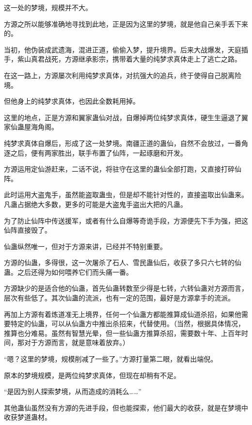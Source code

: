 
\begin{this_body}



这一处的梦境，规模并不大。

方源之所以能够准确地寻找到此地，正是因为这里的梦境，就是他自己亲手丢下来的。

当初，他伪装成武遗海，混进正道，偷偷入梦，提升境界。后来大战爆发，天庭插手，紫山真君战死，方源继承影宗，携带着大量的纯梦求真体走上了逃亡之路。

在这一路上，方源屡次利用纯梦求真体，对抗强大的追兵，终于使得自己脱离险境。

但他身上的纯梦求真体，也因此全数耗用掉。

这里的地点，正是方源和翼家蛊仙对战，自爆掉两位纯梦求真体，硬生生逼退了翼家仙蛊屋海角阁。

纯梦求真体自爆后，形成了这一处梦境。南疆正道的蛊仙，自然不会放过，一番角逐之后，便有两家胜出，联手布置了仙阵，一起琢磨和开发。

方源运用定仙游赶来，二话不说，将驻守在这里的蛊仙全部打跑，又直接打碎仙阵。

此时运用大盗鬼手，虽然能盗取蛊虫，但是却不能针对性的，直接盗取出仙蛊来。凡蛊占据绝大多数，更多的可能是大盗鬼手盗出大把的凡蛊。

为了防止仙阵中传送援军，或者有什么自爆等奇诡手段，方源便先下手为强，把这仙阵直接毁了。

仙蛊纵然唯一，但对于方源来讲，已经并不特别重要。

方源的仙蛊，多得很，这一次屠杀了石人、雪民蛊仙后，收获了多只六七转的仙蛊。之后还得为如何喂养它们而头痛一番。

方源缺少的是适合他的仙蛊，首先仙蛊转数至少得是七转，六转仙蛊对方源而言，层次有些低了。其次仙蛊的流派，也有一定的范围，最好是方源拿手的流派。

再加上方源有着炼道准无上境界，任何一个仙蛊方都能推算成仙道杀招，如果他需要特定的仙蛊，可以从仙蛊方中推出杀招来，代替使用。（当然，根据具体情况，推算也分难易。虽然有智慧光晕，但一些仙蛊方推算杀招，需要数十年、上百年时间，那对于方源而言，就是意味着放弃。）

“嗯？这里的梦境，规模削减了一些了。”方源打量第二眼，就看出端倪。

原本的梦境规模，是两位纯梦求真体，但现在却稍有不足。

“是因为别人探索梦境，从而造成的消耗么……”

其他蛊仙虽然没有方源的先进手段，但也能探索，他们最大的收获，就是在梦境中收获梦道蛊材。


\end{this_body}
